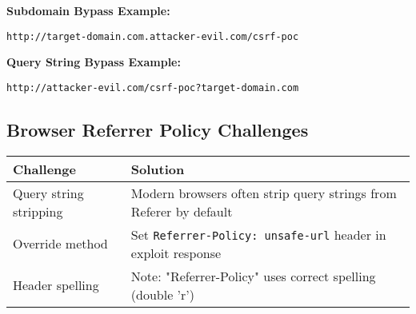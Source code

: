 \documentclass{article}
\begin{document}
\vspace{.25cm}

\textbf{Subdomain Bypass Example:}
\begin{lstlisting}[frame=single, basicstyle=\footnotesize\ttfamily]
http://target-domain.com.attacker-evil.com/csrf-poc
\end{lstlisting}

\textbf{Query String Bypass Example:}
\begin{lstlisting}[frame=single, basicstyle=\footnotesize\ttfamily]
http://attacker-evil.com/csrf-poc?target-domain.com
\end{lstlisting}

\subsection*{Browser Referrer Policy Challenges}
\begin{tabular}{>{\raggedright\arraybackslash}p{}>{\raggedright\arraybackslash}p{}}
    \toprule
    \textbf{Challenge} & \textbf{Solution} \\
    \midrule
    Query string stripping & Modern browsers often strip query strings from Referer by default \\
    Override method & Set \texttt{Referrer-Policy: unsafe-url} header in exploit response \\
    Header spelling & Note: "Referrer-Policy" uses correct spelling (double 'r') \\
    \bottomrule
\end{tabular}
\end{document}

